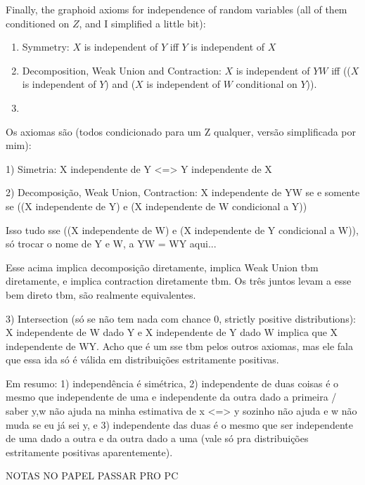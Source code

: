 Finally, the graphoid axioms for independence of random variables (all of them conditioned on $Z$, and I simplified a little bit):

\begin{enumerate}
	\item Symmetry: $X$ is independent of $Y$ iff $Y$ is independent of $X$
	\item Decomposition, Weak Union and Contraction: $X$ is independent of $YW$ iff (($X$ is independent of $Y$) and ($X$ is independent of $W$ conditional on $Y$)).
	\item 
\end{enumerate}

Os axiomas são (todos condicionado para um Z qualquer, versão simplificada por mim):

1) Simetria: X independente de Y <=> Y independente de X

2) Decomposição, Weak Union, Contraction: X independente de YW se e somente se ((X independente de Y) e (X independente de W condicional a Y))

Isso tudo sse ((X independente de W) e (X independente de Y condicional a W)), só trocar o nome de Y e W, a YW = WY aqui...

Esse acima implica decomposição diretamente, implica Weak Union tbm diretamente, e implica contraction diretamente tbm. Os três juntos levam a esse bem direto tbm, são realmente equivalentes.

3) Intersection (só se não tem nada com chance 0, strictly positive distributions): X independente de W dado Y e X independente de Y dado W implica que X independente de WY. Acho que é um sse tbm pelos outros axiomas, mas ele fala que essa ida só é válida em distribuições estritamente positivas.

Em resumo: 1) independência é simétrica, 2) independente de duas coisas é o mesmo que independente de uma e independente da outra dado a primeira / saber y,w não ajuda na minha estimativa de x <=> y sozinho não ajuda e w não muda se eu já sei y, e 3) independente das duas é o mesmo que ser independente de uma dado a outra e da outra dado a uma (vale só pra distribuições estritamente positivas aparentemente).


NOTAS NO PAPEL PASSAR PRO PC

